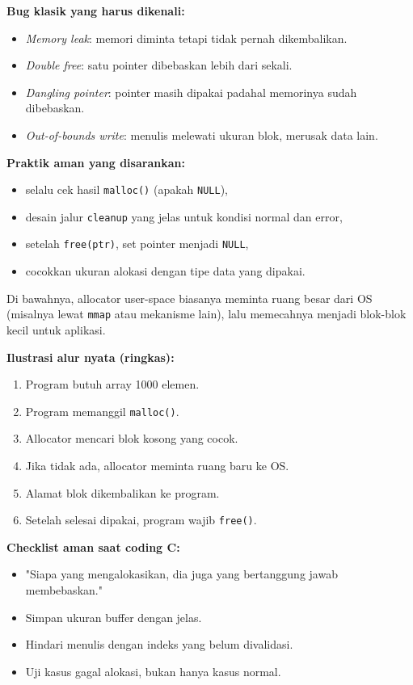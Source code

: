 \textbf{Bug klasik yang harus dikenali:}
\begin{itemize}
    \item \textit{Memory leak}: memori diminta tetapi tidak pernah dikembalikan.
    \item \textit{Double free}: satu pointer dibebaskan lebih dari sekali.
    \item \textit{Dangling pointer}: pointer masih dipakai padahal memorinya sudah dibebaskan.
    \item \textit{Out-of-bounds write}: menulis melewati ukuran blok, merusak data lain.
\end{itemize}

\textbf{Praktik aman yang disarankan:}
\begin{itemize}
    \item selalu cek hasil \texttt{malloc()} (apakah \texttt{NULL}),
    \item desain jalur \texttt{cleanup} yang jelas untuk kondisi normal dan error,
    \item setelah \texttt{free(ptr)}, set pointer menjadi \texttt{NULL},
    \item cocokkan ukuran alokasi dengan tipe data yang dipakai.
\end{itemize}

Di bawahnya, allocator user-space biasanya meminta ruang besar dari OS (misalnya lewat \texttt{mmap} atau mekanisme lain), lalu memecahnya menjadi blok-blok kecil untuk aplikasi.

\textbf{Ilustrasi alur nyata (ringkas):}
\begin{enumerate}
    \item Program butuh array 1000 elemen.
    \item Program memanggil \texttt{malloc()}.
    \item Allocator mencari blok kosong yang cocok.
    \item Jika tidak ada, allocator meminta ruang baru ke OS.
    \item Alamat blok dikembalikan ke program.
    \item Setelah selesai dipakai, program wajib \texttt{free()}.
\end{enumerate}

\textbf{Checklist aman saat coding C:}
\begin{itemize}
    \item "Siapa yang mengalokasikan, dia juga yang bertanggung jawab membebaskan."
    \item Simpan ukuran buffer dengan jelas.
    \item Hindari menulis dengan indeks yang belum divalidasi.
    \item Uji kasus gagal alokasi, bukan hanya kasus normal.
\end{itemize}

